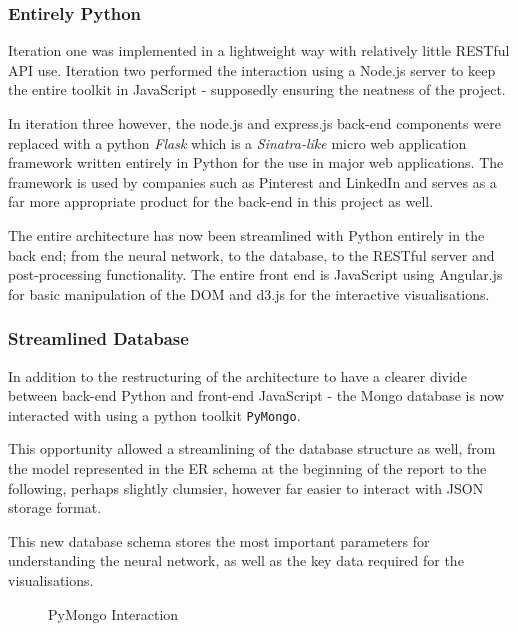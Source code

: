 \documentclass[a4paper,11pt,titlepage]{article}
\begin{document}
	\subsubsection{Entirely Python}
	Iteration one was implemented in a lightweight way with relatively little RESTful API use. Iteration two performed the interaction using a Node.js server to keep the entire toolkit in JavaScript - supposedly ensuring the neatness of the project. 
	\par 
	In iteration three however, the node.js and express.js back-end components were replaced with a python \textit{Flask} which is a \textit{Sinatra-like} micro web application framework written entirely in Python for the use in major web applications. The framework is used by companies such as Pinterest and LinkedIn and serves as a far more appropriate product for the back-end in this project as well.
	\par 
	The entire architecture has now been streamlined with Python entirely in the back end; from the neural network, to the database, to the RESTful server and post-processing functionality. The entire front end is JavaScript using Angular.js for basic manipulation of the DOM and d3.js for the interactive visualisations.
	\par 
	
	\subsubsection{Streamlined Database}
	In addition to the restructuring of the architecture to have a clearer divide between back-end Python and front-end JavaScript - the Mongo database is now interacted with using a python toolkit \texttt{PyMongo}. 
	\par 
	This opportunity allowed a streamlining of the database structure as well, from the model represented in the ER schema at the beginning of the report to the following, perhaps slightly clumsier, however far easier to interact with JSON storage format.
	\par 
	This new database schema stores the most important parameters for understanding the neural network, as well as the key data required for the visualisations.
	

	\begin{figure}[H]
    			\caption{PyMongo Interaction}%
	\end{figure}		
	
\end{document}

